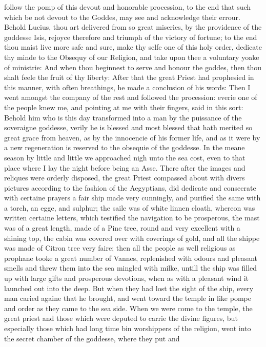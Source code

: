 follow the pomp of this devout and honorable procession, to the end that such
which be not devout to the Goddes, may see and acknowledge their errour. Behold
Lucius, thou art delivered from so great miseries, by the providence of the
goddesse Isis, rejoyce therefore and triumph of the victory of fortune; to the
end thou maist live more safe and sure, make thy selfe one of this holy order,
dedicate thy minde to the Obsequy of our Religion, and take upon thee a
voluntary yoake of ministrie: And when thou beginnest to serve and honour the
goddes, then thou shalt feele the fruit of thy liberty: After that the great
Priest had prophesied in this manner, with often breathings, he made a
conclusion of his words: Then I went amongst the company of the rest and
followed the procession: everie one of the people knew me, and pointing at me
with their fingers, said in this sort: Behold him who is this day transformed
into a man by the puissance of the soveraigne goddesse, verily he is blessed
and most blessed that hath merited so great grace from heaven, as by the
innocencie of his former life, and as it were by a new regeneration is reserved
to the obsequie of the goddesse. In the meane season by little and little we
approached nigh unto the sea cost, even to that place where I lay the night
before being an Asse. There after the images and reliques were orderly
disposed, the great Priest compassed about with divers pictures according to
the fashion of the Aegyptians, did dedicate and consecrate with certaine
prayers a fair ship made very cunningly, and purified the same with a torch, an
egge, and sulphur; the saile was of white linnen cloath, whereon was written
certaine letters, which testified the navigation to be prosperous, the mast was
of a great length, made of a Pine tree, round and very excellent with a shining
top, the cabin was covered over with coverings of gold, and all the shippe was
made of Citron tree very faire; then all the people as well religious as
prophane tooke a great number of Vannes, replenished with odours and pleasant
smells and threw them into the sea mingled with milke, untill the ship was
filled up with large gifts and prosperous devotions, when as with a pleasant
wind it launched out into the deep. But when they had lost the sight of the
ship, every man caried againe that he brought, and went toward the temple in
like pompe and order as they came to the sea side. When we were come to the
temple, the great priest and those which were deputed to carrie the divine
figures, but especially those which had long time bin worshippers of the
religion, went into the secret chamber of the goddesse, where they put and
